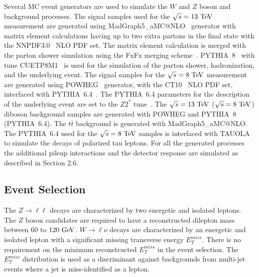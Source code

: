 Several MC event generators are used to simulate the $W$ and $Z$ boson and background processes. The signal samples used for the $\sqrt{s}=13~\mathrm{Te\kern -0.1em V}$ measurement are generated using MadGraph5\_aMC@NLO~\cite{Alwall:2007st} generator with matrix element calculations having up to two extra partons in the final state with the NNPDF3.0~\cite{Ball:2014uwa} NLO PDF set. The matrix element calculation is merged with the parton shower simulation using the FxFx merging scheme~\cite{Frederix:2012ps}. PYTHIA~8~\cite{Sjostrand:2006za,Sjostrand:2014zea}  with tune CUETP8M1~\cite{Skands:2014pea} is used for the simulation of the parton shower, hadronization, and the underlying event.  The signal samples for the $\sqrt{s}=8~\mathrm{Te\kern -0.1em V}$ measurement are generated using POWHEG~\cite{POWHEG-V, POWHEG1, POWHEG2, POWHEG3} generator, with the CT10~\cite{Lai:2010vv} NLO PDF set, interfaced with PYTHIA~6.4~\cite{Sjostrand:2006za}. The PYTHIA~6.4 parameters for the description of the underlying event are set to the $Z2^{*}$ tune~\cite{CMS-PAS-FSQ-12-020}. The  $\sqrt{s}=13~\mathrm{Te\kern -0.1em V}$ ($\sqrt{s}=8~\mathrm{Te\kern -0.1em V}$) diboson background samples are generated with POWHEG and PYTHIA~8 (PYTHIA~6.4). The $t\bar{t}$ background is generated with MadGraph5\_aMC@NLO. The PYTHIA~6.4 used for the  $\sqrt{s}=8~\mathrm{Te\kern -0.1em V}$ samples is interfaced with TAUOLA to simulate the decays of polarized tau leptons. For all the generated processes the additional pileup interactions and the detector response are simulated as described in Section 2.6.

\subsection{Event Selection}

The $Z \rightarrow \ell\ell$ decays are characterized by two energetic and isolated leptons. The $Z$ boson candidates are required to have a reconstructed dilepton mass between $60$ to $120~\mathrm{Ge\kern -0.1em V}$. $W \rightarrow \ell \nu$ decays are characterized by an energetic and isolated lepton with a significant missing transverse energy $E_{T}^{miss}$. There is no requirement on the minimum reconstructed $E_{T}^{miss}$ in the event selection. The $E_{T}^{miss}$ distribution is used as a discriminant against backgrounds from multi-jet events where a jet is miss-identified as a lepton.

